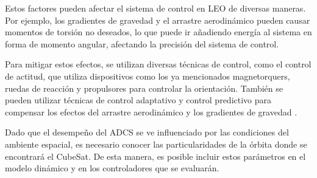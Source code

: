 Estos factores pueden afectar el sistema de control en LEO de diversas maneras. Por ejemplo, los gradientes de gravedad y el arrastre aerodinámico pueden causar momentos de torsión no deseados, lo que puede ir añadiendo energía al sistema en forma de momento angular, afectando la precisión del sistema de control.
 
Para mitigar estos efectos, se utilizan diversas técnicas de control, como el control de actitud, que utiliza dispositivos como los ya mencionados magnetorquers, ruedas de reacción y propulsores para controlar la orientación. También se pueden utilizar técnicas de control adaptativo y control predictivo para compensar los efectos del arrastre aerodinámico y los gradientes de gravedad \cite{Junkins1997}.

Dado que el desempeño del ADCS se ve influenciado por las condiciones del ambiente espacial, es necesario conocer las particularidades de la órbita donde se encontrará el CubeSat. De esta manera, es posible incluir estos parámetros en el modelo dinámico y en los controladores que se evaluarán. 


